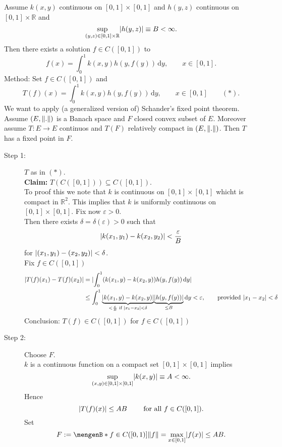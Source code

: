 
\begin{beispiel}
	Assume $k(x,y)$ continuous on $[0,1] \times [0,1]$ and $h(y,z)$ continuous on $[0,1]\times \mathbb{R}$ and 
	\[
		\sup\limits_{(y,z) \in [0,1] \times \mathbb{R}} \lvert h(y,z)\rvert \equiv B < \infty.
	\]
	Then there exists a solution $f \in C([0,1])$ to 
	\[
		f(x) = \int_{0}^{1} k(x,y)h(y,f(y)) \,\mathrm{d}y, \qquad x \in [0,1].
	\]
	Method: Set $f \in C([0,1])$ and
	\[
		T(f)(x) = \int_{0}^{1}k(x,y)h(y,f(y)) \,\mathrm{d}y, \qquad x \in [0,1] \qquad (*).
	\]
	We want to apply (a generalized version of) Schander's fixed point theorem. Assume $(E, \norm{.})$ is a Banach space and $F$ closed convex subset of $E$. Moreover assume $T: E \to E$ continuos and $T(F)$ relatively compact in $(E,\norm{.})$. Then $T$ has a fixed point in $F$. \\
	\begin{description}
		\item[Step 1:] $T$ as in $(*)$. \\
		\textbf{Claim:} \text{    }     $T(C([0,1])) \subseteq C([0,1])$. \\
		To proof this we note that $k$ is continuous on $[0,1] \times [0,1]$ whicht is compact in $\mathbb{R}^2$. This implies that $k$
 is uniformly continuous on $[0,1]\times [0,1]$. Fix now $\varepsilon >0$. \\
 Then there exists $\delta = \delta (\varepsilon) >0$ such that
 \[
 	\lvert k(x_1,y_1)- k(x_2,y_2)\rvert < \frac{\varepsilon}{B}
 \]
 for $\lvert(x_1,y_1)- (x_2,y_2)\rvert< \delta $. \\
 Fix $f \in C([0,1])$
 	\begin{align*}
 		\lvert T(f)(x_1)-T(f)(x_2)\rvert & = \lvert \int_{0}^{1}(k(x_1,y)-k(x_2,y))h(y,f(y)) \,\mathrm{d}y\rvert \\
		&\leq \int_{0}^{1}\underset{< \frac{\varepsilon}{B} \text{ if } \lvert x_1-x_2\rvert< \delta }{\underbrace{\lvert k(x_1,y)-k(x_2,y)\rvert}}\underset{\leq B}{\underbrace{\lvert h(y,f(y))\rvert}} \,\mathrm{d}y < \varepsilon, \qquad \text{provided }\lvert x_1-x_2\rvert< \delta
 	\end{align*}
	Conclusion: $T(f) \in C([0,1])$ for $f \in C([0,1])$
	\item[Step 2:] Choose $F$. \\
	$k$ is a continuous function on a compact set $[0,1] \times [0,1]$ implies
	\[
		\sup\limits_{(x,y) \in [0,1] \times [0,1]} \lvert k(x,y)\rvert \equiv A < \infty.
	\]
	Hence 
	\[
		\lvert T(f)(x)\rvert \leq  AB \qquad \text{ for all }f \in C([0,1]).
	\]
	Set 
	\[
		F:= \set[f \in C([0,1])]{\norm{f} = \max_{x \in [0,1]}\abs{f(x)} \leq AB}.
\]
\end{description}
\end{beispiel}
